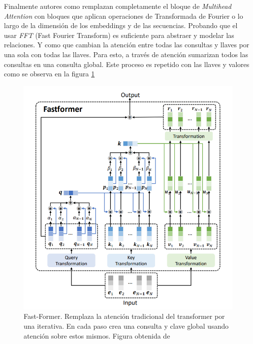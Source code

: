 Finalmente autores como \citeauthor*{DBLP:journals/corr/abs-2105-03824} remplazan completamente
el bloque de \textit{Multihead Attention} con bloques que aplican operaciones de Transformada de
Fourier o lo largo de la dimensión de los  embeddings y de las secuencias. Probando que el usar
\textit{FFT} (Fast Fourier Transform) es suficiente para abstraer y modelar las relaciones. Y como
\citeauthor*{DBLP:journals/corr/abs-2108-09084} que cambian la atención entre todas las consultas
y llaves por una sola con todas las llaves. Para esto, a través de atención sumarizan todos las
consultas en una consulta global. Este proceso es repetido con las llaves y valores como se observa
en la figura \ref{fig:fast-former}

\begin{figure}[ht!]
    \centering
    \includegraphics[width=0.6 \textwidth]{Chapters/1. Transformer/Figures/transformer/fastformer.png}
    \caption{Fast-Former. Remplaza la atención tradicional del  transformer por una iterativa. En
             cada paso crea una consulta y clave global usando atención sobre estos mismos.
             Figura obtenida de \cite{DBLP:journals/corr/abs-2108-09084}}
    \label{fig:fast-former}
\end{figure}
